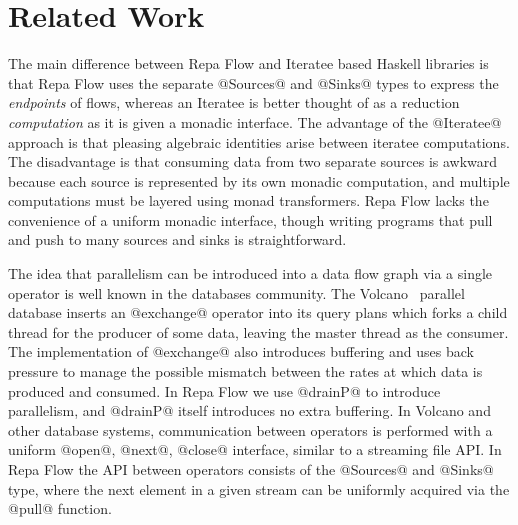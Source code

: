 \section{Related Work}

The main difference between Repa Flow and Iteratee based Haskell libraries 
\cite{Kiselyov:iteratee, hackage:enumerator, hackage:conduit, hackage:pipes} is that Repa Flow uses the separate @Sources@ and @Sinks@ types to express the \emph{endpoints} of flows, whereas an Iteratee is better thought of as a reduction \emph{computation} as it is given a monadic interface. The advantage of the @Iteratee@ approach is that pleasing algebraic identities arise between iteratee computations. The disadvantage is that consuming data from two separate sources is awkward because each source is represented by its own monadic computation, and multiple computations must be layered using monad transformers. Repa Flow lacks the convenience of a uniform monadic interface, though writing programs that pull and push to many sources and sinks is straightforward.

The idea that parallelism can be introduced into a data flow graph via a single operator is well known in the databases community. The Volcano~\cite{Graefe:Volcano} parallel database inserts an @exchange@ operator into its query plans which forks a child thread for the producer of some data, leaving the master thread as the consumer. The implementation of @exchange@ also introduces buffering and uses back pressure to manage the possible mismatch between the rates at which data is produced and consumed. In Repa Flow we use @drainP@ to introduce parallelism, and @drainP@ itself introduces no extra buffering. In Volcano and other database systems, communication between operators is performed with a uniform @open@, @next@, @close@ interface, similar to a streaming file API. In Repa Flow the API between operators consists of the @Sources@ and @Sinks@ type, where the next element in a given stream can be uniformly acquired via the @pull@ function.


